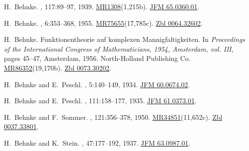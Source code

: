 \documentclass[11pt,a4paper, final, twoside]{article}
\numberwithin{equation}{section}
\begin{document}
\begin{appendices}
\begin{thebibliography}{100}
H.~Behnke.
, 117:89--97, 1939.
\newblock \href{http://www.ams.org/mathscinet-getitem?mr=1308}{MR1308}(1,215b).
  \href{http://zbmath.org/?q=an:65.0360.01}{JFM 65.0360.01}.

H.~Behnke.
, 6:353--368, 1955.
\newblock
  \href{http://www.ams.org/mathscinet-getitem?mr=75655}{MR75655}(17,785c).
  \href{http://zbmath.org/?q=an:0064.32602}{Zbl 0064.32602}.

H.~Behnke.
\newblock Funktionentheorie auf komplexen {M}annigfaltigkeiten.
\newblock In {\em Proceedings of the {I}nternational {C}ongress of
  {M}athematicians, 1954, {A}msterdam, vol. {III}}, pages 45--47, Amsterdam,
  1956. North-Holland Publishing Co.
\newblock
  \href{http://www.ams.org/mathscinet-getitem?mr=86352}{MR86352}(19,170b).
  \href{http://zbmath.org/?q=an:0073.30202}{Zbl 0073.30202}.

H.~Behnke and E.~Peschl.
, 5:140--149, 1934.
\newblock \href{http://zbmath.org/?q=an:60.0674.02}{JFM 60.0674.02}.

H.~Behnke and E.~Peschl.
, 111:158--177, 1935.
\newblock \href{http://zbmath.org/?q=an:61.0373.01}{JFM 61.0373.01}.

H.~Behnke and F.~Sommer.
, 121:356--378, 1950.
\newblock
  \href{http://www.ams.org/mathscinet-getitem?mr=34851}{MR34851}(11,652c).
  \href{http://zbmath.org/?q=an:0037.33801}{Zbl 0037.33801}.

H.~Behnke and K.~Stein.
,
  47:177--192, 1937.
\newblock \href{http://zbmath.org/?q=an:63.0987.01}{JFM 63.0987.01}.


\end{thebibliography}
\end{appendices}
\end{document}
